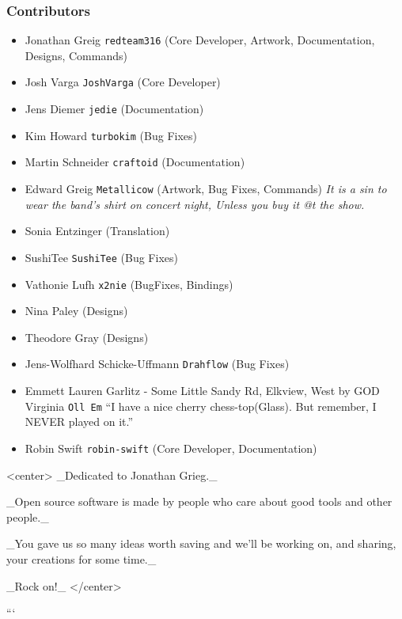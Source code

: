 \subsubsection{Contributors}

\begin{itemize}
\item Jonathan Greig \texttt{redteam316} (Core Developer, Artwork, Documentation, Designs, Commands)
\item Josh Varga \texttt{JoshVarga} (Core Developer)
\item Jens Diemer \texttt{jedie} (Documentation)
\item Kim Howard \texttt{turbokim} (Bug Fixes)
\item Martin Schneider \texttt{craftoid} (Documentation)
\item Edward Greig \texttt{Metallicow} (Artwork, Bug Fixes, Commands)
    \emph{It is a sin to wear the band's shirt on concert night, Unless you buy it @t the show.}
\item Sonia Entzinger (Translation)
\item SushiTee \texttt{SushiTee} (Bug Fixes)
\item Vathonie Lufh \texttt{x2nie} (BugFixes, Bindings)
\item Nina Paley (Designs)
\item Theodore Gray (Designs)
\item Jens-Wolfhard Schicke-Uffmann \texttt{Drahflow} (Bug Fixes)
\item Emmett Lauren Garlitz - Some Little Sandy Rd, Elkview, West by GOD Virginia \texttt{Oll Em}
    ``I have a nice cherry chess-top(Glass). But remember, I NEVER played on it.''
\item Robin Swift \texttt{robin-swift} (Core Developer, Documentation)
\end{itemize}
<center>
_Dedicated to Jonathan Grieg._
    
_Open source software is made by people who care about good tools and other people._

_You gave us so many ideas worth saving and we'll be working on, and sharing, your creations for some time._
        
_Rock on!_
</center>

```
\documentclass[a4paper]{report}

\usepackage[utf8]{inputenc}
\usepackage[T1]{fontenc}

\usepackage[english]{babel} %

